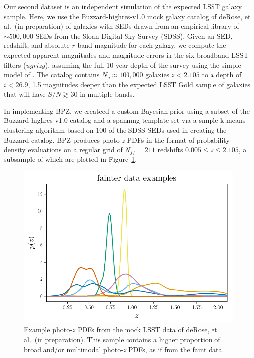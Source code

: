 \documentclass[\docopts]{\docclass}
\newcommand{\pz}{photo-$z$ PDF}
\newcommand{\ssdata}{faint\xspace}
\begin{document}
Our second dataset is an independent simulation of the expected LSST galaxy 
sample.
Here, we use the Buzzard-highres-v1.0 mock galaxy catalog of deRose, et al.\ 
(in preparation) of galaxies with SEDs drawn from an empirical library of 
$\sim500,000$ SEDs from the Sloan Digital Sky Survey (SDSS).
Given an SED, redshift, and absolute $r$-band magnitude for each galaxy, we 
compute the expected apparent magnitudes and magnitude errors in the six 
broadband LSST filters ($ugrizy$), assuming the full 10-year depth of the 
survey using the simple model of \citet{ivezic_lsst:_2008}.
The catalog contains $N_{g}\approx100,000$ galaxies $z<2.105$ to a depth of 
$i<26.9$, 1.5 magnitudes deeper than the expected LSST Gold sample of galaxies 
that will have $S/N\gtrsim30$ in multiple bands.

In implementing BPZ, we createed a custom Bayesian prior using a subset of the 
Buzzard-highres-v1.0 catalog and a spanning template set via a simple k-means 
clustering algorithm based on $100$ of the SDSS SEDs used in creating the 
Buzzard catalog.
BPZ produces \pz s in the format of probability density evaluations on a 
regular grid of $N_{ff}=211$ redshifts $0.005\leq z\leq2.105$, a subsample of 
which are plotted in Figure~\ref{fig:schmidt_pzs}.

\begin{figure}
  \begin{center}
    \includegraphics[width=\columnwidth]{figures/schmidt_pzs.pdf}
    \caption{Example \pz s from the mock LSST data of deRose, et al.\ (in 
preparation).
    This sample contains a higher proportion of broad and/or multimodal \pz s, 
as if from the \ssdata data.
    \label{fig:schmidt_pzs}}
  \end{center}
\end{figure}
\end{document}

